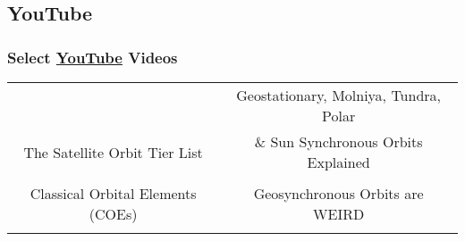 \subsection{YouTube}

\begin{frame}\frametitle{Select \href{https://www.youtube.com/}{YouTube} Videos}
\begin{table}[htp]
\begin{center}
\begin{tabular}{cc}
	& {\tiny{Geostationary, Molniya, Tundra, Polar}} \\[-5pt]
	{\tiny{The Satellite Orbit Tier List}} & {\tiny{\& Sun Synchronous Orbits Explained}} \\
	\href{https://youtu.be/SbbAnVU4rmY}{
	\begin{overpic}[ scale = 0.075 ]
		{\pLocalGraphics YouTube/orbit-tier}
	\end{overpic}} &
	\href{\utube{PZAkiXNJIqc}}{
	\begin{overpic}[ scale = 0.075 ]
		{\pLocalGraphics YouTube/orbit-types}
	\end{overpic}} \\[5pt]
	{\tiny{Classical Orbital Elements (COEs)}} & {\tiny{Geosynchronous Orbits are WEIRD}} \\	%
	\href{\utube{2gAYqtmNJx8}}{
	\begin{overpic}[ scale = 0.075 ]
		{\pLocalGraphics YouTube/orbit-coe}
	\end{overpic}} &
	\href{\utube{tI8OqpkOVzs}}{
	\begin{overpic}[ scale = 0.075 ]
		{\pLocalGraphics YouTube/orbit-geo}
	\end{overpic}}
\end{tabular}
\end{center}
\label{tab:utube-tables}
\end{table}%
\end{frame}

